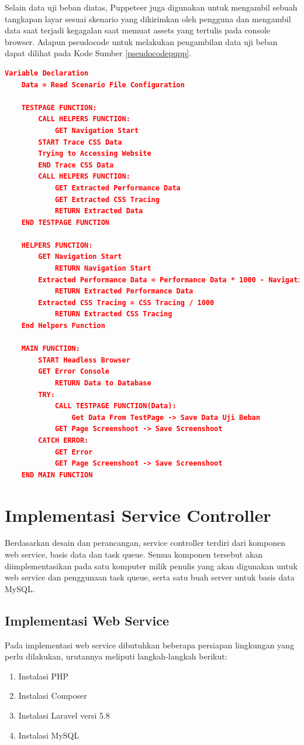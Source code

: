 	 	\indent Selain data uji beban diatas, Puppeteer juga digunakan untuk mengambil sebuah tangkapan layar sesuai skenario yang dikirimkan oleh pengguna dan mengambil data saat terjadi kegagalan saat memuat assets yang tertulis pada console browser. Adapun pseudocode untuk melakukan pengambilan data uji beban dapat dilihat pada Kode Sumber \ref{pseudocodepupp}.
	 	
	 	\begin{lstlisting}[frame=single,tabsize=2,breaklines,caption={Pseudocode Puppeteer },label=pseudocodepupp, captionpos=b, language=json]
 	Variable Declaration
 	Data = Read Scenario File Configuration
 	
 	TESTPAGE FUNCTION:
 		CALL HELPERS FUNCTION:
 			GET Navigation Start
 		START Trace CSS Data
 		Trying to Accessing Website
 		END Trace CSS Data
 		CALL HELPERS FUNCTION:
 			GET Extracted Performance Data
 			GET Extracted CSS Tracing
 			RETURN Extracted Data
 	END TESTPAGE FUNCTION
 	
 	HELPERS FUNCTION:
 		GET Navigation Start
 			RETURN Navigation Start
 		Extracted Performance Data = Performance Data * 1000 - Navigation Start
 			RETURN Extracted Performance Data
 		Extracted CSS Tracing = CSS Tracing / 1000
 			RETURN Extracted CSS Tracing 
 	End Helpers Function
 	
 	MAIN FUNCTION:
 		START Headless Browser
 		GET Error Console
 			RETURN Data to Database
 		TRY:
 			CALL TESTPAGE FUNCTION(Data):
 				Get Data From TestPage -> Save Data Uji Beban
 			GET Page Screenshoot -> Save Screenshoot
 		CATCH ERROR:
 			GET Error
 			GET Page Screenshoot -> Save Screenshoot
 	END MAIN FUNCTION
	 	\end{lstlisting}
	
	\section{Implementasi Service Controller}
		Berdasarkan desain dan perancangan, service controller terdiri dari komponen web service, basis data dan task queue. Semua komponen tersebut akan diimplementasikan pada satu komputer milik penulis yang akan digunakan untuk web service dan penggunaan task queue, serta satu buah server untuk basis data MySQL.
		
		\subsection{Implementasi Web Service}
			Pada implementasi web service dibutuhkan beberapa persiapan lingkungan yang perlu dilakukan, urutannya meliputi langkah-langkah berikut:
			\begin{enumerate}
				\item Instalasi PHP
				\item Instalasi Composer
				\item Instalasi Laravel versi 5.8
				\item Instalasi MySQL
			\end{enumerate}
			
